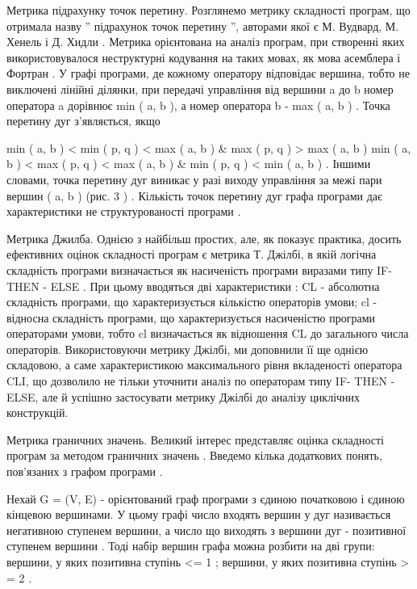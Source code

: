 Метрика підрахунку точок перетину.
Розглянемо метрику складності програм, що отримала назву '' підрахунок точок перетину '', авторами якої є М. Вудвард, М. Хенель і Д. Хидли . Метрика орієнтована на аналіз програм, при створенні яких використовувалося неструктурні кодування на таких мовах, як мова асемблера і Фортран .
У графі програми, де кожному оператору відповідає вершина, тобто не виключені лінійні ділянки, при передачі управління від вершини a до b номер оператора a дорівнює min ( a, b ), а номер оператора b - max ( a, b ) . Точка перетину дуг з'являється, якщо

min ( a, b ) \textless{} min ( p, q ) \textless{} max ( a, b ) \& max ( p, q ) \textgreater{} max ( a, b ) \textbar{}
min ( a, b ) \textless{} max ( p, q ) \textless{} max ( a, b ) \& min ( p, q ) \textless{} min ( a, b ) .
Іншими словами, точка перетину дуг виникає у разі виходу управління за межі пари вершин ( a, b ) (рис. 3 ) .
Кількість точок перетину дуг графа програми дає характеристики не структурованості програми .

Метрика Джилба.
Однією з найбільш простих, але, як показує практика, досить ефективних оцінок складності програм є метрика Т. Джілбі, в якій логічна складність програми визначається як насиченість програми виразами типу IF- THEN - ELSE . При цьому вводяться дві характеристики : CL - абсолютна складність програми, що характеризується кількістю операторів умови; cl - відносна складність програми, що характеризується насиченістю програми операторами умови, тобто cl визначається як відношення CL до загального числа операторів.
Використовуючи метрику Джілбі, ми доповнили її ще однією складовою, а саме характеристикою максимального рівня вкладеності оператора CLI, що дозволило не тільки уточнити аналіз по операторам типу IF- THEN - ELSE, але й успішно застосувати метрику Джілбі до аналізу циклічних конструкцій.

Метрика граничних значень.
Великий інтерес представляє оцінка складності програм за методом граничних значень .
Введемо кілька додаткових понять, пов'язаних з графом програми .

Нехай G = (V, E) - орієнтований граф програми з єдиною початковою і єдиною кінцевою вершинами. У цьому графі число входять вершин у дуг називається негативною ступенем вершини, а число що виходять з вершини дуг - позитивної ступенем вершини . Тоді набір вершин графа можна розбити на дві групи: вершини, у яких позитивна ступінь \textless{}= 1 ; вершини, у яких позитивна ступінь \textgreater{} = 2 .

